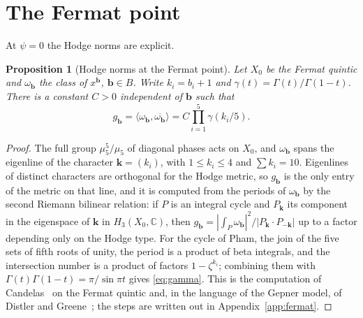 \documentclass[11pt]{amsart}
\newtheorem{proposition}[theorem]{Proposition}
\theoremstyle{definition}
\theoremstyle{remark}
\newcommand{\C}{\mathbb{C}}
\newcommand{\ip}[2]{\langle #1,#2\rangle}
\newcommand{\bb}{\mathbf{b}}
\begin{document}
\section{The Fermat point}\label{sec:fermat}

At $\psi=0$ the Hodge norms are explicit.

\begin{proposition}[Hodge norms at the Fermat point]\label{prop:fermat}
Let $X_0$ be the Fermat quintic and $\omega_{\bb}$ the class of $x^{\bb}$,
$\bb\in B$. Write $k_i=b_i+1$ and $\gamma(t)=\Gamma(t)/\Gamma(1-t)$. There
is a constant $C>0$ independent of $\bb$ such that
\begin{equation}\label{eq:gamma}
g_{\bb}=\ip{\omega_{\bb}}{\overline{\omega_{\bb}}}=C\prod_{i=1}^5
\gamma(k_i/5).
\end{equation}
\end{proposition}

\begin{proof}
The full group $\mu_5^5/\mu_5$ of diagonal phases acts on $X_0$, and
$\omega_{\bb}$ spans the eigenline of the character $\mathbf k=(k_i)$, with
$1\le k_i\le4$ and $\sum k_i=10$. Eigenlines of distinct characters are
orthogonal for the Hodge metric, so $g_{\bb}$ is the only entry of the
metric on that line, and it is computed from the periods of $\omega_{\bb}$
by the second Riemann bilinear relation: if $P$ is an integral cycle and
$P_{\mathbf k}$ its component in the eigenspace of $\mathbf k$ in
$H_3(X_0,\C)$, then $g_{\bb}=|\int_P\omega_{\bb}|^2/
|P_{\mathbf k}\cdot P_{-\mathbf k}|$ up to a factor depending only on the
Hodge type. For the cycle of Pham, the join of the five sets of fifth roots
of unity, the period is a product of beta integrals, and the intersection
number is a product of factors $1-\zeta^{k_i}$; combining them with
$\Gamma(t)\Gamma(1-t)=\pi/\sin\pi t$ gives \eqref{eq:gamma}. This is the
computation of Candelas~\cite{Can88} on the Fermat quintic and, in the
language of the Gepner model, of Distler and Greene~\cite{DG88}; the steps
are written out in Appendix~\ref{app:fermat}.
\end{proof}
\end{document}
